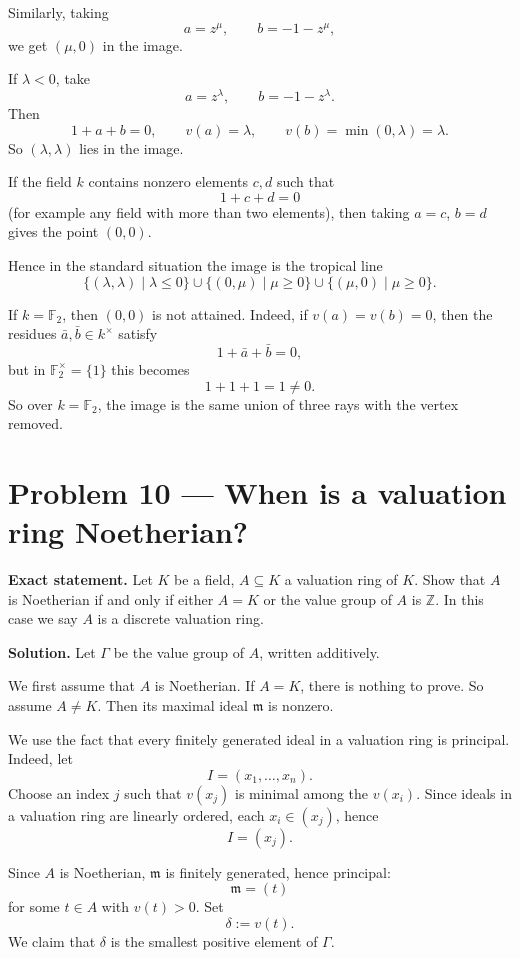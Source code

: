 \documentclass[12pt,a4paper]{article}
\theoremstyle{plain}
\theoremstyle{definition}      %
\begin{document}
Similarly, taking
\[
a=z^\mu,\qquad b=-1-z^\mu,
\]
we get \((\mu,0)\) in the image.

If \(\lambda<0\), take
\[
a=z^\lambda,\qquad b=-1-z^\lambda.
\]
Then
\[
1+a+b=0,
\qquad
v(a)=\lambda,
\qquad
v(b)=\min(0,\lambda)=\lambda.
\]
So \((\lambda,\lambda)\) lies in the image.

If the field \(k\) contains nonzero elements \(c,d\) such that
\[
1+c+d=0
\]
(for example any field with more than two elements), then taking \(a=c\), \(b=d\) gives the point \((0,0)\).

Hence in the standard situation the image is the tropical line
\[
\{(\lambda,\lambda)\mid \lambda\le 0\}
\cup
\{(0,\mu)\mid \mu\ge 0\}
\cup
\{(\mu,0)\mid \mu\ge 0\}.
\]

\medskip

If \(k=\mathbb F_2\), then \((0,0)\) is not attained. Indeed, if \(v(a)=v(b)=0\), then the residues \(\bar a,\bar b\in k^\times\) satisfy
\[
1+\bar a+\bar b=0,
\]
but in \(\mathbb F_2^\times=\{1\}\) this becomes
\[
1+1+1=1\neq 0.
\]
So over \(k=\mathbb F_2\), the image is the same union of three rays with the vertex removed.

\bigskip

\section*{Problem 10 --- When is a valuation ring Noetherian?}

\textbf{Exact statement.}
Let \(K\) be a field, \(A\subseteq K\) a valuation ring of \(K\). Show that \(A\) is Noetherian if and only if either \(A=K\) or the value group of \(A\) is \(\mathbb Z\). In this case we say \(A\) is a discrete valuation ring.

\textbf{Solution.}
Let \(\Gamma\) be the value group of \(A\), written additively.

We first assume that \(A\) is Noetherian. If \(A=K\), there is nothing to prove. So assume \(A\neq K\). Then its maximal ideal \(\mathfrak m\) is nonzero.

We use the fact that every finitely generated ideal in a valuation ring is principal. Indeed, let
\[
I=(x_1,\dots,x_n).
\]
Choose an index \(j\) such that \(v(x_j)\) is minimal among the \(v(x_i)\). Since ideals in a valuation ring are linearly ordered, each \(x_i\in (x_j)\), hence
\[
I=(x_j).
\]

Since \(A\) is Noetherian, \(\mathfrak m\) is finitely generated, hence principal:
\[
\mathfrak m=(t)
\]
for some \(t\in A\) with \(v(t)>0\). Set
\[
\delta:=v(t).
\]
We claim that \(\delta\) is the smallest positive element of \(\Gamma\).
\end{document}

